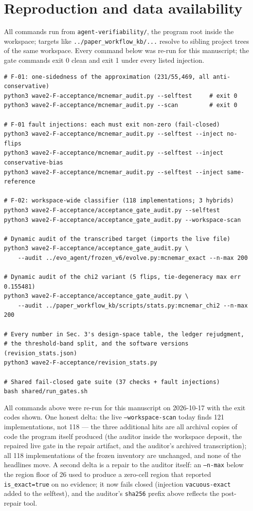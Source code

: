 \documentclass[10pt]{article}
\newcommand{\code}[1]{\texttt{#1}}
\begin{document}
\appendix

\section{Reproduction and data availability}\label{app:repro}

All commands run from \code{agent-verifiability/}, the program root inside
the workspace; targets like \code{../paper\_workflow\_kb/...} resolve to
sibling project trees of the same workspace. Every command below was re-run
for this manuscript; the gate commands exit 0 clean and exit 1 under every
listed injection.

\begin{verbatim}
# F-01: one-sidedness of the approximation (231/55,469, all anti-conservative)
python3 wave2-F-acceptance/mcnemar_audit.py --selftest     # exit 0
python3 wave2-F-acceptance/mcnemar_audit.py --scan         # exit 0

# F-01 fault injections: each must exit non-zero (fail-closed)
python3 wave2-F-acceptance/mcnemar_audit.py --selftest --inject no-flips
python3 wave2-F-acceptance/mcnemar_audit.py --selftest --inject conservative-bias
python3 wave2-F-acceptance/mcnemar_audit.py --selftest --inject same-reference

# F-02: workspace-wide classifier (118 implementations; 3 hybrids)
python3 wave2-F-acceptance/acceptance_gate_audit.py --selftest
python3 wave2-F-acceptance/acceptance_gate_audit.py --workspace-scan

# Dynamic audit of the transcribed target (imports the live file)
python3 wave2-F-acceptance/acceptance_gate_audit.py \
    --audit ../evo_agent/frozen_v6/evolve.py:mcnemar_exact --n-max 200

# Dynamic audit of the chi2 variant (5 flips, tie-degeneracy max err 0.155481)
python3 wave2-F-acceptance/acceptance_gate_audit.py \
    --audit ../paper_workflow_kb/scripts/stats.py:mcnemar_chi2 --n-max 200

# Every number in Sec. 3's design-space table, the ledger rejudgment,
# the threshold-band split, and the software versions (revision_stats.json)
python3 wave2-F-acceptance/revision_stats.py

# Shared fail-closed gate suite (37 checks + fault injections)
bash shared/run_gates.sh
\end{verbatim}

All commands above were re-run for this manuscript on 2026-10-17 with the
exit codes shown. One honest delta: the live \code{--workspace-scan} today
finds 121 implementations, not 118 --- the three additional hits are all
archival copies of code the program itself produced (the auditor inside
the workspace deposit, the repaired live gate in the repair artifact, and the
auditor's archived transcription); all 118 implementations of the frozen
inventory are unchanged, and none of the headlines move. A second delta
is a repair to the auditor itself: an \code{--n-max} below the region
floor of 26 used to produce a zero-cell region that reported
\code{is\_exact=true} on no evidence; it now fails closed (injection
\code{vacuous-exact} added to the selftest), and the auditor's
\code{sha256} prefix above reflects the post-repair tool.
\end{document}
